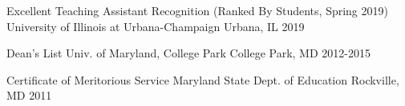 




\begin{cvhonors}

  \cvhonor
    {Excellent Teaching Assistant Recognition (Ranked By Students, Spring 2019)} %
    {University of Illinois at Urbana-Champaign} %
    {Urbana, IL} %
    {2019} %

  \cvhonor
    {Dean’s List} %
    {Univ. of Maryland, College Park} %
    {College Park, MD} %
    {2012-2015} %

  \cvhonor
    {Certificate of Meritorious Service} %
    {Maryland State Dept. of Education} %
    {Rockville, MD} %
    {2011} %


\end{cvhonors}

